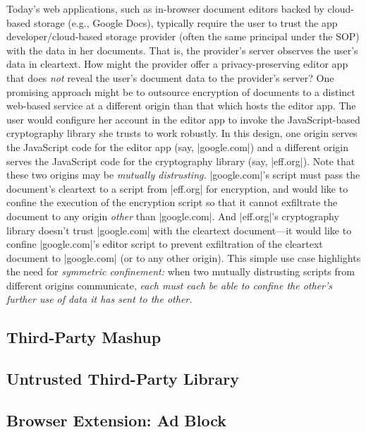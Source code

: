 Today's web applications, such as in-browser document editors backed
by cloud-based storage (e.g., Google Docs), typically require the user
to trust the app developer/cloud-based storage provider (often the
same principal under the SOP) with the data in her documents. That is,
the provider's server observes the user's data in cleartext. How might
the provider offer a privacy-preserving editor app that does {\em not}
reveal the user's document data to the provider's server?  One
promising approach might be to outsource encryption of documents to a
distinct web-based service at a different origin than that which hosts
the editor app. The user would configure her account in the editor app
to invoke the JavaScript-based cryptography library she trusts to work
robustly. In this design, one origin serves the JavaScript code for
the editor app (say, \js|google.com|) and a different origin serves
the JavaScript code for the cryptography library (say,
\js|eff.org|). Note that these two origins may be {\em mutually
  distrusting.}  \js|google.com|'s script must pass the document's
cleartext to a script from \js|eff.org| for encryption, and would like
to confine the execution of the encryption script so that it cannot
exfiltrate the document to any origin {\em other} than
\js|google.com|. And \js|eff.org|'s cryptography library doesn't trust
\js|google.com| with the cleartext document---it would like to confine
\js|google.com|'s editor script to prevent exfiltration of the
cleartext document to \js|google.com| (or to any other origin). This
simple use case highlights the need for {\em symmetric confinement:}
when two mutually distrusting scripts from different origins
communicate, {\em each must each be able to confine the other's
  further use of data it has sent to the other.}


\subsection{Third-Party Mashup}

\subsection{Untrusted Third-Party Library}

\subsection{Browser Extension: Ad Block}
